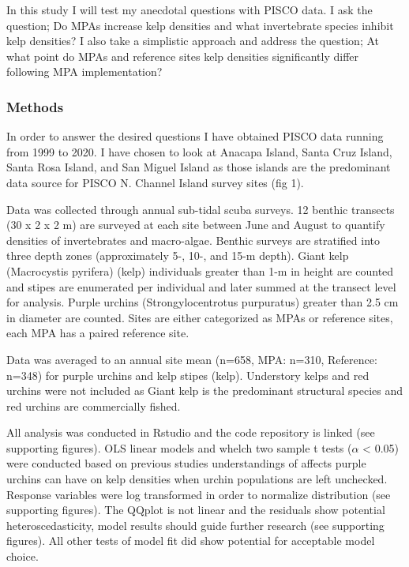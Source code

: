 \documentclass[
]{article}
\begin{document}
In this study I will test my anecdotal questions with PISCO data. I ask
the question; Do MPAs increase kelp densities and what invertebrate
species inhibit kelp densities? I also take a simplistic approach and
address the question; At what point do MPAs and reference sites kelp
densities significantly differ following MPA implementation?

\hypertarget{methods}{%
\subsubsection{Methods}\label{methods}}

In order to answer the desired questions I have obtained PISCO data
running from 1999 to 2020. I have chosen to look at Anacapa Island,
Santa Cruz Island, Santa Rosa Island, and San Miguel Island as those
islands are the predominant data source for PISCO N. Channel Island
survey sites (fig 1).

Data was collected through annual sub-tidal scuba surveys. 12 benthic
transects (30 x 2 x 2 m) are surveyed at each site between June and
August to quantify densities of invertebrates and macro-algae. Benthic
surveys are stratified into three depth zones (approximately 5-, 10-,
and 15-m depth). Giant kelp (Macrocystis pyrifera) (kelp) individuals
greater than 1-m in height are counted and stipes are enumerated per
individual and later summed at the transect level for analysis. Purple
urchins (Strongylocentrotus purpuratus) greater than 2.5 cm in diameter
are counted. Sites are either categorized as MPAs or reference sites,
each MPA has a paired reference site.

Data was averaged to an annual site mean (n=658, MPA: n=310, Reference:
n=348) for purple urchins and kelp stipes (kelp). Understory kelps and
red urchins were not included as Giant kelp is the predominant
structural species and red urchins are commercially fished.

All analysis was conducted in Rstudio and the code repository is linked
(see supporting figures). OLS linear models and whelch two sample t
tests (\(\alpha\) \textless{} 0.05) were conducted based on previous
studies understandings of affects purple urchins can have on kelp
densities when urchin populations are left unchecked. Response variables
were log transformed in order to normalize distribution (see supporting
figures). The QQplot is not linear and the residuals show potential
heteroscedasticity, model results should guide further research (see
supporting figures). All other tests of model fit did show potential for
acceptable model choice.
\end{document}
